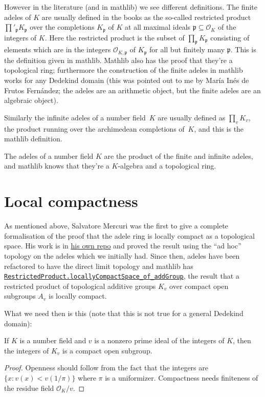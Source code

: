 However in the literature (and in mathlib) we see different definitions.
The finite adeles of $K$ are usually defined in the books
as the so-called restricted product $\prod'_{\mathfrak{p}}K_{\mathfrak{p}}$ over the completions
$K_{\mathfrak{p}}$ of $K$ at all maximal ideals $\mathfrak{p}\subseteq\mathcal{O}_K$ of the
integers of $K$. Here the restricted product is the subset of $\prod_{\mathfrak{p}}K_{\mathfrak{p}}$
consisting of elements which are in the integers $\mathcal{O}_{K,\mathfrak{p}}$ of
$K_{\mathfrak{p}}$ for all but finitely many $\mathfrak{p}$. This is the definition given in
mathlib. Mathlib also has the proof that they're a topological ring;
furthermore the construction of the finite adeles in mathlib works for any
Dedekind domain (this was pointed out to me by Mar\'ia In\'es
de Frutos Fern\'andez; the adeles
are an arithmetic object, but the finite adeles are an algebraic object).

Similarly the infinite adeles of a number field~$K$
are usually defined as $\prod_v K_v$,
the product running over the archimedean completions of~$K$, and this is
the mathlib definition.

The adeles of a number field $K$ are the product of the finite and infinite
adeles, and mathlib knows that they're a $K$-algebra and a topological ring.

\section{Local compactness}

As mentioned above, Salvatore Mercuri was the first to give a complete formalisation of the proof
that the adele ring is locally compact as a topological space. His work is in
\href{https://github.com/smmercuri/adele-ring_locally-compact}{his own repo} and proved the
result using the ``ad hoc'' topology on the adeles which we initially had. Since then,
adeles have been refactored to have the direct limit topology and mathlib has
\href{https://leanprover-community.github.io/mathlib4_docs/Mathlib/Topology/Algebra/RestrictedProduct.html\#RestrictedProduct.locallyCompactSpace_of_addGroup}
{\tt RestrictedProduct.locallyCompactSpace\_of\_addGroup}, the result
that a restricted product of topological additive groups $K_v$ over compact open
subgroups $A_v$ is locally compact.

What we need then is this (note that this is not true for a general Dedekind domain):
\begin{theorem}
  \label{NumberField.instCompactSpaceAdicCompletionIntegers}
  \leanok
  If $K$ is a number field and $v$ is a nonzero prime ideal of the integers of $K$,
  then the integers of $K_v$ is a compact open subgroup.
\end{theorem}
\begin{proof} Openness should follow from the fact that the integers are
  $\{x : v(x)<v(1/\pi)\}$ where $\pi$ is a uniformizer. Compactness needs
  finiteness of the residue field $\mathcal{O}_K/v$.
\end{proof}

